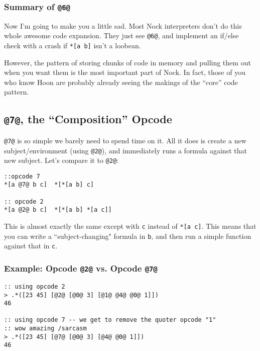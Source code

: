 \documentclass[twoside]{article}
\begin{document}
\subsubsection{Summary of \lstinline[style=inlinecode]{@6@}}

Now I'm going to make you a little sad. Most Nock interpreters don't do this whole awesome code expansion. They just see \lstinline[style=inlinecode]{@6@}, and implement an if/else check with a crash if \lstinline[style=inlinecode]{*[a b]} isn't a loobean.

However, the pattern of storing chunks of code in memory and pulling them out when you want them is the most important part of Nock. In fact, those of you who know Hoon are probably already seeing the makings of the ``core'' code pattern.

\subsection{\lstinline[style=inlinecode]{@7@}, the “Composition” Opcode}

\lstinline[style=inlinecode]{@7@} is so simple we barely need to spend time on it. All it does is create a new subject/environment (using \lstinline[style=inlinecode]{@2@}), and immediately runs a formula against that new subject. Let's compare it to \lstinline[style=inlinecode]{@2@}:

\begin{lstlisting}[style=listingcode]
::opcode 7
*[a @7@ b c]  *[*[a b] c]

:: opcode 2
*[a @2@ b c]  *[*[a b] *[a c]]
\end{lstlisting}

This is almost exactly the same except with \lstinline[style=inlinecode]{c} instead of \lstinline[style=inlinecode]{*[a c]}. This means that you can write a ``subject-changing" formula in \lstinline[style=inlinecode]{b}, and then run a simple function against that in \lstinline[style=inlinecode]{c}.

\subsubsection{Example: Opcode \lstinline[style=inlinecode]{@2@} vs. Opcode \lstinline[style=inlinecode]{@7@}}

\begin{lstlisting}[style=listingcode]
:: using opcode 2
> .*([23 45] [@2@ [@0@ 3] [@1@ @4@ @0@ 1]])
46

:: using opcode 7 -- we get to remove the quoter opcode "1"
:: wow amazing /sarcasm
> .*([23 45] [@7@ [@0@ 3] [@4@ @0@ 1]])
46
\end{lstlisting}
\end{document}
